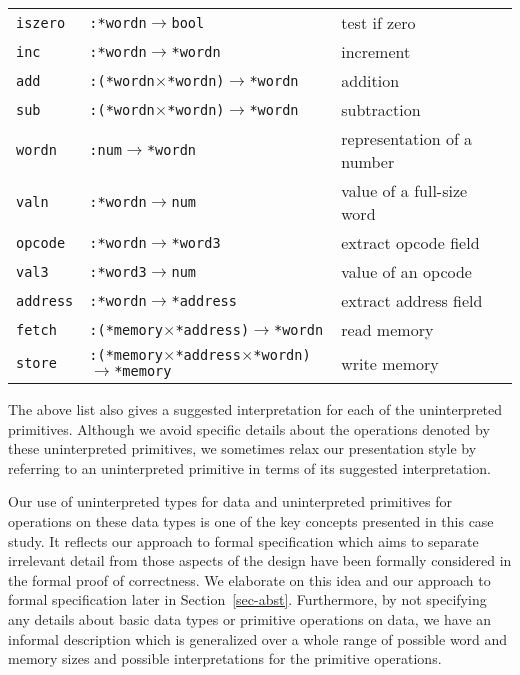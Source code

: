 \begin{center}
\begin{tabular}{lll}
\verb"iszero"&
\verb":*wordn"$\rightarrow$\verb"bool"&
test if zero\\
\verb"inc"&
\verb":*wordn"$\rightarrow$\verb"*wordn"&
increment\\
\verb"add"&
\verb":(*wordn"$\times$\verb"*wordn)"$\rightarrow$\verb"*wordn"&
addition\\
\verb"sub"&
\verb":(*wordn"$\times$\verb"*wordn)"$\rightarrow$\verb"*wordn"&
subtraction\\
\verb"wordn"&
\verb":num"$\rightarrow$\verb"*wordn"&
representation of a number\\
\verb"valn"&
\verb":*wordn"$\rightarrow$\verb"num"&
value of a full-size word\\
\verb"opcode"&
\verb":*wordn"$\rightarrow$\verb"*word3"&
extract opcode field\\
\verb"val3"&
\verb":*word3"$\rightarrow$\verb"num"&
value of an opcode\\
\verb"address"&
\verb":*wordn"$\rightarrow$\verb"*address"&
extract address field\\
\verb"fetch"&
\verb":(*memory"$\times$\verb"*address)"$\rightarrow$\verb"*wordn"&
read memory\\
\verb"store"&
\verb":(*memory"$\times$\verb"*address"$\times$\verb"*wordn)"$\rightarrow$\verb"*memory"&
write memory
\end{tabular}
\end{center}

The above list also gives a suggested interpretation for each of
the uninterpreted primitives.
Although we avoid specific details about
the operations denoted by these uninterpreted primitives,
we sometimes relax our presentation style
by referring to an uninterpreted primitive in terms of its
suggested interpretation.

Our use of uninterpreted types for data and uninterpreted primitives for
operations on these data types is one of the key concepts presented
in this case study.
It reflects our approach to formal specification
which aims to separate irrelevant detail from
those aspects of the design
have been formally considered in the formal proof of correctness.
We elaborate on this idea and
our approach to formal specification later in Section~\ref{sec-abst}.
Furthermore, by not specifying any details about
basic data types or primitive operations on data, we have an informal
description which is generalized
over a whole range of possible word and memory
sizes and possible interpretations
for the primitive operations.

